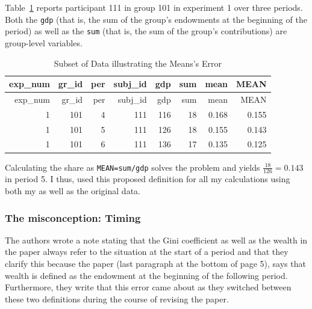 \documentclass[
  authoryear,
  preprint,
  3p]{elsarticle}
\begin{document}
Table~\ref{tbl-mean-error} reports participant 111 in group 101 in
experiment 1 over three periods. Both the \texttt{gdp} (that is, the sum
of the group's endowments at the beginning of the period) as well as the
\texttt{sum} (that is, the sum of the group's contributions) are
group-level variables.

\hypertarget{tbl-mean-error}{}
\begin{longtable}[]{@{}rrrrrrrr@{}}
\caption{\label{tbl-mean-error}Subset of Data illustrating the Means's
Error}\tabularnewline
\toprule()
exp\_num & gr\_id & per & subj\_id & gdp & sum & mean & MEAN \\
\midrule()
\endfirsthead
\toprule()
exp\_num & gr\_id & per & subj\_id & gdp & sum & mean & MEAN \\
\midrule()
\endhead
1 & 101 & 4 & 111 & 116 & 18 & 0.168 & 0.155 \\
1 & 101 & 5 & 111 & 126 & 18 & 0.155 & 0.143 \\
1 & 101 & 6 & 111 & 136 & 17 & 0.135 & 0.125 \\
\bottomrule()
\end{longtable}

Calculating the share as \texttt{MEAN=sum/gdp} solves the problem and
yields \(\frac{18}{126}=0.143\) in period 5. I thus, used this proposed
definition for all my calculations using both my as well as the original
data.

\hypertarget{the-misconception-timing}{%
\subsubsection{The misconception:
Timing}\label{the-misconception-timing}}

The authors wrote a note stating that the Gini coefficient as well as
the wealth in the paper always refer to the situation at the start of a
period and that they clarify this because the paper (last paragraph at
the bottom of page 5), says that wealth is defined as the endowment at
the beginning of the following period. Furthermore, they write that this
error came about as they switched between these two definitions during
the course of revising the paper.
\end{document}
